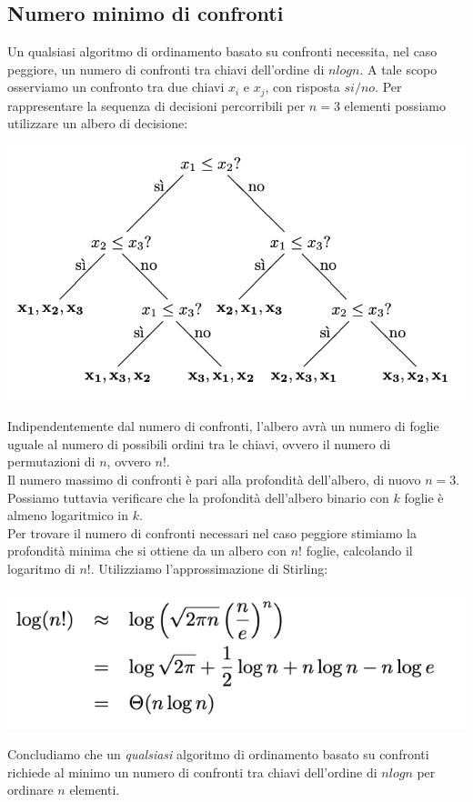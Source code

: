\documentclass[11pt, oneside]{article}   	%
\begin{document}
\subsection*{Numero minimo di confronti}
Un qualsiasi algoritmo di ordinamento basato su confronti necessita, nel caso peggiore, un numero di confronti tra chiavi dell'ordine di $n log n$. A tale scopo osserviamo un confronto tra due chiavi $x_i$ e $x_j$, con risposta $si/no$. Per rappresentare la sequenza di decisioni percorribili per $n = 3$ elementi possiamo utilizzare un albero di decisione: 
\begin{center}
\includegraphics[scale=0.8]{albero}
\end{center}
Indipendentemente dal numero di confronti, l'albero avrà un numero di foglie uguale al numero di possibili ordini tra le chiavi, ovvero il numero di permutazioni di $n$, ovvero $n!$. \\Il numero massimo di confronti è pari alla profondità dell'albero, di nuovo $n=3$. Possiamo tuttavia verificare che la profondità dell'albero binario con $k$ foglie è almeno logaritmico in $k$.\\
Per trovare il numero di confronti necessari nel caso peggiore stimiamo la profondità minima che si ottiene da un albero con $n!$ foglie, calcolando il logaritmo di $n!$. Utilizziamo l'approssimazione di Stirling:
\begin{center}
\includegraphics[scale=0.8]{stirling}
\end{center}
Concludiamo che un \emph{qualsiasi} algoritmo di ordinamento basato su confronti richiede al minimo un numero di confronti tra chiavi dell'ordine di $n log n$ per ordinare $n$ elementi.
\end{document}
